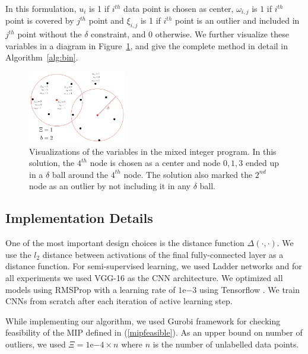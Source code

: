 \documentclass{article}
\begin{document}
In this formulation, $u_i$ is 1 if $i^{th}$ data point is chosen as center, $\omega_{i,j}$ is $1$ if $i^{th}$ point is covered by $j^{th}$ point and $\xi_{i,j}$ is 1 if $i^{th}$ point is an outlier and included in $j^{th}$ point without the $\delta$ constraint, and $0$ otherwise. We further visualize these variables in a diagram in Figure~\ref{mip}, and give the complete method in detail in Algorithm~\ref{alg:bin}. 


\begin{figure}
\vspace{-5mm}
  \begin{center}
\includegraphics[width=0.38\textwidth]{mip.pdf}
\end{center}
    \caption{Visualizations of the variables in the mixed integer program. In this solution, the $4^{th}$ node is chosen as a center and node $0,1,3$ ended up in a $\delta$ ball around the $4^{th}$ node. The solution also marked the $2^{nd}$ node as an outlier by not including it in any $\delta$ ball.}
\label{mip}
\vspace{-12mm}
\end{figure}




\subsection{Implementation Details}
\label{sec:imp}
One of the most important design choices is the distance function $\Delta(\cdot,\cdot)$. We use the $l_2$ distance between activations of the final fully-connected layer as a distance function. For semi-supervised learning, we used Ladder networks \cite{ladder} and for all experiments we used VGG-16 \cite{vgg} as the CNN architecture. We optimized all models using RMSProp with a learning rate of $1\mathrm{e}{-3}$ using Tensorflow \cite{tensorflow}. We train CNNs from scratch after each iteration of active learning step.

While implementing our algorithm, we used Gurobi \cite{gurobi} framework for checking feasibility of the MIP defined in (\ref{mipfeasible}). As an upper bound on number of outliers, we used $\Xi=1\mathrm{e}{-4} \times n$ where $n$ is the number of unlabelled data points.
\end{document}
